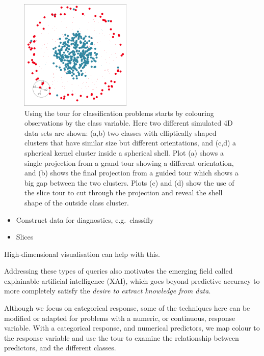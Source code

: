 \documentclass[
  letterpaper,
]{krantz}
\providecommand{\tightlist}{%
  \setlength{\itemsep}{0pt}\setlength{\parskip}{0pt}}\usepackage{longtable,booktabs,array}
\begin{document}
\begin{figure}
\begin{minipage}{0.50\linewidth}
\end{minipage}%
%
\begin{minipage}{0.50\linewidth}

\includegraphics[width=2.08333in,height=\textheight,keepaspectratio]{images/intro_class4.png}

\end{minipage}%

\caption{\label{fig-class-intro-pdf}Using the tour for classification
problems starts by colouring observations by the class variable. Here
two different simulated 4D data sets are shown: (a,b) two classes with
elliptically shaped clusters that have similar size but different
orientations, and (c,d) a spherical kernel cluster inside a spherical
shell. Plot (a) shows a single projection from a grand tour showing a
different orientation, and (b) shows the final projection from a guided
tour which shows a big gap between the two clusters. Plots (c) and (d)
show the use of the slice tour to cut through the projection and reveal
the shell shape of the outside class cluster.}

\end{figure}%

\begin{itemize}
\tightlist
\item
  Construct data for diagnostics, e.g.~classifly
\item
  Slices
\end{itemize}

High-dimensional visualisation can help with this.

Addressing these types of queries also motivates the emerging field
called explainable artificial intelligence (XAI), which goes beyond
predictive accuracy to more completely satisfy the \emph{desire to
extract knowledge from data}.

Although we focus on categorical response, some of the techniques here
can be modified or adapted for problems with a numeric, or continuous,
response variable. With a categorical response, and numerical
predictors, we map colour to the response variable and use the tour to
examine the relationship between predictors, and the different classes.
\end{document}
